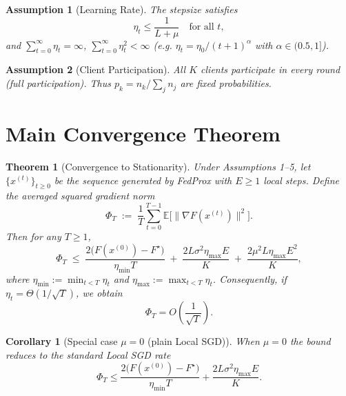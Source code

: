 \documentclass{article}
\newcommand{\E}{\mathbb{E}}
\newtheorem{theorem}{Theorem}
\newtheorem{assumption}{Assumption}
\newtheorem{corollary}{Corollary}
\begin{document}
\begin{assumption}[Learning Rate]
The stepsize satisfies
\[
\eta_t \le \frac{1}{L+\mu}\quad\text{for all }t,
\]
and $\sum_{t=0}^{\infty}\eta_t = \infty$, $\sum_{t=0}^{\infty}\eta_t^{2}<\infty$ 
(e.g. $\eta_t=\eta_0/(t+1)^{\alpha}$ with $\alpha\in(0.5,1]$).
\end{assumption}

\begin{assumption}[Client Participation]
All $K$ clients participate in every round (full participation).  
Thus $p_k=n_k/\sum_j n_j$ are fixed probabilities.
\end{assumption}

\section*{Main Convergence Theorem}
\begin{theorem}[Convergence to Stationarity]\label{thm:main}
Under Assumptions 1–5, let $\{x^{(t)}\}_{t\ge0}$ be the sequence generated by
FedProx with $E\ge1$ local steps. Define the averaged squared gradient norm
\[
\Phi_T\;:=\;\frac{1}{T}\sum_{t=0}^{T-1}\E\bigl[\|\nabla F(x^{(t)})\|^2\bigr].
\]
Then for any $T\ge1$,
\[
\Phi_T\;\le\;
\frac{2\bigl(F(x^{(0)})-F^\star\bigr)}{\eta_{\min}T}
\;+\;
\frac{2L\sigma^2\eta_{\max}E}{K}
\;+\;
\frac{2\mu^2 L\eta_{\max}E^2}{K},
\]
where $\eta_{\min}:=\min_{t<T}\eta_t$ and $\eta_{\max}:=\max_{t<T}\eta_t$.
Consequently, if $\eta_t=\Theta(1/\sqrt{T})$, we obtain
\[
\Phi_T = O\!\left(\frac{1}{\sqrt{T}}\right).
\]
\end{theorem}

\begin{corollary}[Special case $\mu=0$ (plain Local SGD)]
When $\mu=0$ the bound reduces to the standard Local SGD rate
\[
\Phi_T\le
\frac{2\bigl(F(x^{(0)})-F^\star\bigr)}{\eta_{\min}T}
+\frac{2L\sigma^2\eta_{\max}E}{K}.
\]
\end{corollary}

\end{document}
